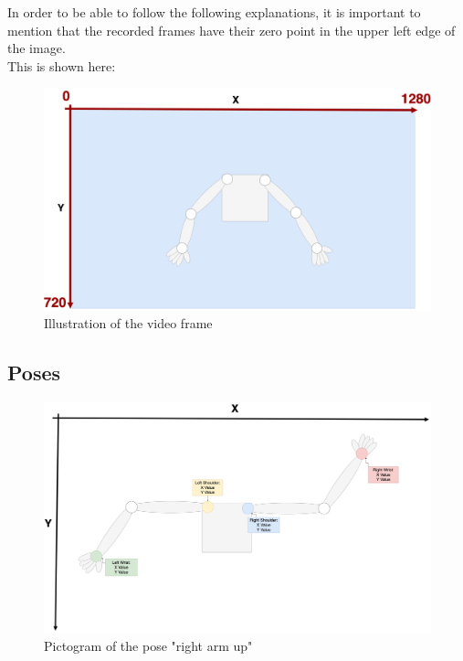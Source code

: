 \documentclass[a4paper,11pt,singlespacing]{article}
\begin{document}
In order to be able to follow the following explanations, it is important to mention that the recorded frames have their 
zero point in the upper left edge of the image.\\
This is shown here:

\begin{figure}[H]
	\centering
	\includegraphics[width=\textwidth]{images/video_frame.png}
	\caption{Illustration of the video frame}
	\label{video_frame}
\end{figure}

\subsection{Poses}
\begin{figure}[H]
	\centering
	\includegraphics[width=\textwidth]{images/right_arm_up.png}
	\caption{Pictogram of the pose "right arm up"}
	\label{right_arm_up}
\end{figure}
\end{document}
